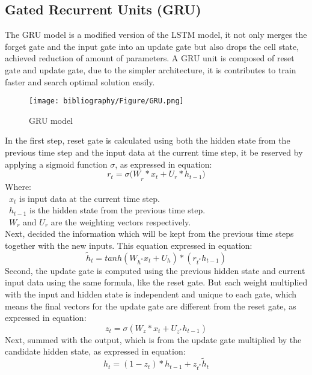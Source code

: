 \documentclass{ieeeojies}
\begin{document}
\subsection{Gated Recurrent Units (GRU)}
The GRU model is a modified version of the LSTM model, it not only merges the forget gate and the input gate into an update gate but also drops the cell state, achieved reduction of amount of parameters. A GRU unit is composed of reset gate and update gate, due to the simpler architecture, it is contributes to train faster and search optimal solution easily.
\begin{figure}[H]
    \centering
    \texttt{[image: bibliography/Figure/GRU.png]}
    \caption{GRU model}
    \label{fig:fig7}
\end{figure}
In the first step, reset gate is calculated using both the hidden state from the previous time step and the input data at the current time step, it be reserved by applying a sigmoid function \(\sigma\), as expressed in equation:
\[r_t=\sigma{(W}_r\ast x_t+U_r\ast h_{t-1})\]
Where:\\
	\indent\textbullet\ \(x_t\) is input data at the current time step. \\
	\indent\textbullet\ \(h_{t-1}\) is the hidden state from the previous time step.\\
	\indent\textbullet\ \(W_r\) and \(U_r\) are the weighting vectors respectively.\\
Next, decided the information which will be kept from the previous time steps together with the new inputs. This equation expressed in equation:
\[{\widetilde{h}}_t=tanh{\left(W_{h^\ast}x_t+U_h\right)}\ast\left(r_{t^\ast}h_{t-1}\right)\]
Second, the update gate is computed using the previous hidden state and current input data using the same formula, like the reset gate. But each weight multiplied with the input and hidden state is independent and unique to each gate, which means the final vectors for the update gate are different from the reset gate, as expressed in equation:
\[z_t=\sigma\left(W_z\ast x_t+U_{z^\ast}h_{t-1}\right)\]
Next, summed with the output, which is from the update gate multiplied by the candidate hidden state, as expressed in equation:
\[h_t=\left(1-z_t\right)\ast h_{t-1}+z_{t^\ast}{\widetilde{h}}_t\]
\end{document}
